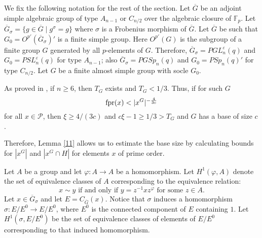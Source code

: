 We fix the following notation for the rest of the section. Let $\overline{G}$ be an adjoint simple algebraic group of  type $A_{n-1}$ or $C_{n/2}$ over the algebraic closure of ${\mathbb{F}_p}$. Let $\overline{G}_{\sigma}=\{g \in \overline{G} \mid g^{\sigma}=g\}$ where $\sigma$ is a Frobenius morphism of $\overline{G}.$ Let $\overline{G}$ be such that $G_0=O^{p'}(\overline{G}_{\sigma})'$ is a finite simple group. Here  $O^{p'}(G)$ is the subgroup of a finite group $G$ generated by all $p$-elements of $G$. Therefore, $\overline{G}_{\sigma}=PGL_n^{\varepsilon}(q)$ and $G_0=PSL_n^{\varepsilon}(q)$ for type $A_{n-1}$; also $\overline{G}_{\sigma}=PGSp_n(q)$ and $G_0=PSp_n(q)'$ for type $C_{n/2}.$ Let  $G$ be a finite almost simple  group with  socle $G_0.$  

As proved in \cite[Proposition 2.2]{burness},  if  $n \ge 6$, then $T_G$ exists and $T_G<1/3$. 
Thus, if for such $G$  
\begin{equation}\label{0} 
\fpr(x)<|x^G|^{-\frac{4}{3c}}
\end{equation}
 for all $x \in \mathscr{P} $, then $\xi \ge {4}/{(3c)}$ and $c\xi -1 \ge 1/3 >T_G$ and $G$ has a base of size $c$.

Therefore, Lemma \ref{11} allows us to estimate the base size by calculating bounds for $|x^G|$ and $|x^G \cap H|$ for elements $x$ of prime order. 


\begin{Def}
\label{H1EE0}
Let $A$ be a group and let $\varphi: A \to A$ be a homomorphism. Let $H^1(\varphi,A)$  denote the set of equivalence classes of $A$ corresponding to the equivalence relation:
$$x \sim y \text{ if and only if } y=z^{-1}xz^{\varphi} \text{ for some } z \in A.$$
Let $x \in \overline{G}_{\sigma}$ and let $E=C_{\overline{G}}(x).$ Notice that $\sigma$ induces a homomorphism $\sigma : E/E^0 \to E/E^0$, where $E^0$ is the connected component of $E$ containing $1.$ Let $H^1(\sigma, E/E^0)$ be the set of equivalence classes of elements of $E/E^0$ corresponding to that induced homomorphism.
\end{Def}



